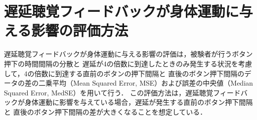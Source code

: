 \section{遅延聴覚フィードバックが身体運動に与える影響の評価方法}
遅延聴覚フィードバックが身体運動に与える影響の評価は，被験者が行うボタン押下の時間間隔の分散と
遅延が4の倍数に到達したときのみ発生する状況を考慮して，4の倍数に到達する直前のボタンの押下間隔と
直後のボタン押下間隔のデータの差の二乗平均（Mean Squared Error, MSE）および誤差の中央値（Median Squared Error, MedSE）を用いて行う．
この評価方法は，遅延聴覚フィードバックが身体運動に影響を与えている場合，遅延が発生する直前のボタン押下間隔と
直後のボタン押下間隔の差が大きくなることを想定している．
